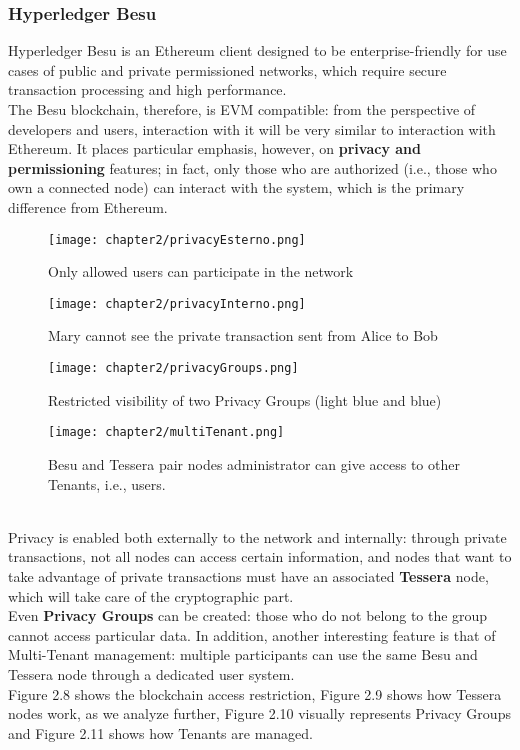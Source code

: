 \subsubsection{Hyperledger Besu}
Hyperledger Besu\cite{site:besu} is an Ethereum client designed to be enterprise-friendly for use cases 
of public and private permissioned networks, which require secure transaction processing
and high performance.\\
The Besu blockchain, therefore, is EVM compatible: from the perspective of developers 
and users, interaction with it will be very similar to interaction with Ethereum. It 
places particular emphasis, however, on \textbf{privacy and permissioning} features; in fact, 
only those who are authorized (i.e., those who own a connected node) can interact with 
the system, which is the primary difference from Ethereum.
\begin{figure}[!htb]
    \begin{minipage}{0.48\textwidth}
        \centering
        \texttt{[image: chapter2/privacyEsterno.png]}
        \caption{Only allowed users can participate in the network}
    \end{minipage}\hfill
    \begin{minipage}{0.48\textwidth}
        \centering
        \texttt{[image: chapter2/privacyInterno.png]}
        \caption{Mary cannot see the private transaction sent from Alice to Bob}
    \end{minipage}
\end{figure}
\begin{figure}[!htb]
    \begin{minipage}{0.48\textwidth}
        \centering
        \texttt{[image: chapter2/privacyGroups.png]}
        \caption{Restricted visibility of two Privacy Groups (light blue and blue)}
    \end{minipage}\hfill
    \begin{minipage}{0.48\textwidth}
        \centering
        \texttt{[image: chapter2/multiTenant.png]}
        \caption{Besu and Tessera pair nodes administrator can give access to other Tenants, i.e., users.}
    \end{minipage}
\end{figure}\\
Privacy is enabled both externally to the network and internally: through private 
transactions, not all nodes can access certain information, and nodes that want to 
take advantage of private transactions must have an associated \textbf{Tessera} node, which 
will take care of the cryptographic part.\\
Even \textbf{Privacy Groups} can be created: those who do not belong to the group cannot access 
particular data. In addition, another interesting feature is that of Multi-Tenant 
management: multiple participants can use the same Besu and Tessera node through a 
dedicated user system\cite{site:besudocs}.\\
Figure 2.8 shows the blockchain access restriction, Figure 2.9 shows how Tessera nodes
work, as we analyze further, Figure 2.10 visually represents Privacy Groups and
Figure 2.11 shows how Tenants are managed. 

